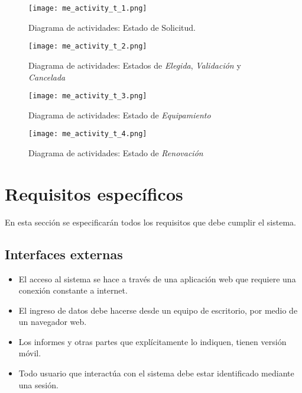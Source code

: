 \documentclass[11pt]{report}
\begin{document}
	\begin{figure}[h]
		\caption[Diagrama de actividades: Solicitud]{Diagrama de actividades: Estado de Solicitud.}
		\label{activity_1}
		\texttt{[image: me\_activity\_t\_1.png]}
	\end{figure}
	
	\begin{figure}[h]
		\caption[Diagrama de actividades: Elegida, Validación y Cancelada]{Diagrama de actividades: Estados de \textit{Elegida}, \textit{Validación} y \textit{Cancelada}}
		\label{activity_2}
		\texttt{[image: me\_activity\_t\_2.png]}
	\end{figure}
	
	\begin{figure}[h]
		\centering
		\caption[Diagrama de actividades: Equipamiento y Renovación]{Diagrama de actividades: Estado de \textit{Equipamiento}}
		\label{activity_3}
		\texttt{[image: me\_activity\_t\_3.png]}
	\end{figure}
	
	\begin{figure}[h]
		\centering
		\caption[Diagrama de actividades: Equipamiento y Renovación]{Diagrama de actividades: Estado de \textit{Renovación}}
		\label{activity_4}
		\texttt{[image: me\_activity\_t\_4.png]}
	\end{figure}
	
	
	\chapter{Requisitos específicos}
	En esta sección se especificarán todos los requisitos que debe cumplir el sistema.
	\section{Interfaces externas}
	\begin{itemize}
		\item El acceso al sistema se hace a través de una aplicación web que requiere una conexión constante a internet.
		\item El ingreso de datos debe hacerse desde un equipo de escritorio, por medio de un navegador web.
		\item Los informes y otras partes que explícitamente lo indiquen, tienen versión móvil.
		\item Todo usuario que interactúa con el sistema debe estar identificado mediante una sesión.
	\end{itemize}
	
\end{document}

